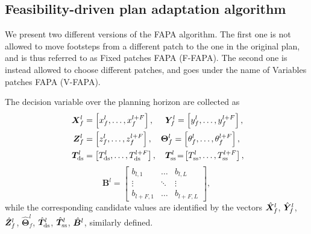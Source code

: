 \subsection{Feasibility-driven plan adaptation algorithm}
We present two different versions of the FAPA algorithm. The first one is not
allowed to move footsteps from a different patch to the one in the original
plan, and is thus referred to as Fixed patches FAPA (F-FAPA). The second one
is instead allowed to choose different patches, and goes under the name of
Variables patches FAPA (V-FAPA).

The decision variable over the planning horizon are collected as
\begin{align*}
    {\bm{X}}_f^l & =  \left[x_f^l,\dots,x_f^{l+F}\right], \quad 
    \,\, {\bm{Y}}_f^l  =  \left[y_f^l,\dots,y_f^{l+F}\right], \\
    \,\, {\bm{Z}}_f^l & = \left[z_f^l,\dots,z_f^{l+F}\right], \quad
    \bm{\Theta}_f^l = \left[\theta_f^l,\dots,\theta_f^{l+F}\right], \\
    \,\, {\bm{T}}_{\rm ds}^l & =  \left[T_{\rm ds}^l,\dots,T_{\rm ds}^{l+F}\right], \quad {\bm{T}}_{\rm ss}^l \!=\! \left[T_{\rm ss}^l,\dots,T_{\rm ss}^{l+F}\right], 
\end{align*}
\begin{equation*}
\bm{B}^l =
\begin{bmatrix}
    b_{l,1}   & \dots  & b_{l,L} \\
    \vdots    & \ddots & \vdots  \\
    b_{l+F,1} & \dots  & b_{l+F,L}
\end{bmatrix},
\end{equation*}
while the corresponding candidate values are identified by the vectors
$\hat {{\bm{X}}}_f^l$, $\hat {{\bm{Y}}}_f^l$, $\hat {{\bm{Z}}}_f^l$, $\hat {\bm{\Theta}}_f^l$, $\hat {{\bm{T}}}^l_{\rm ds}$, $\hat {{\bm{T}}}^l_{\rm ss}$, $\hat {{\bm{B}}}^l$, similarly defined.

